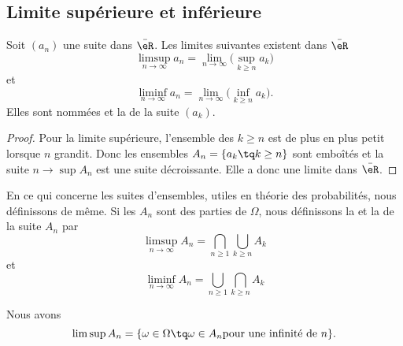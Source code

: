 \subsection{Limite supérieure et inférieure}

\begin{lemmaDef}      \label{ooMVZAooVVCOnP}
    Soit \( (a_n)\) une suite dans \( \bar \eR\). Les limites suivantes existent dans \( \bar \eR\)
    \begin{equation}
        \limsup_{n\to\infty}a_n=\lim_{n\to \infty}\big( \sup_{k\geq n}a_k \big)
    \end{equation}
    et
    \begin{equation}
        \liminf_{n\to \infty}a_n=\lim_{n\to\infty}\big( \inf_{k\geq n}a_k \big).
    \end{equation}
    Elles sont nommées  et la  de la suite \( (a_k)\).
\end{lemmaDef}

\begin{proof}
    Pour la limite supérieure, l'ensemble des \( k\geq n\) est de plus en plus petit lorsque \( n\) grandit. Donc les ensembles \( A_n=\{ a_k\tq k\geq n \}\) sont emboîtés et la suite \( n\to \sup A_n\) est une suite décroissante. Elle a donc une limite dans \( \bar \eR\).
\end{proof}

\begin{normaltext}      \label{ooEEQJooRMFzVR}
    En ce qui concerne les suites d'ensembles, utiles en théorie des probabilités, nous définissons de même. Si les \( A_n\) sont des parties de \( \Omega\), nous définissons la  et la  de la suite \( A_n\) par
\begin{equation}
    \limsup_{n\to\infty}A_n=\bigcap_{n\geq 1}\bigcup_{k\geq n}A_k
\end{equation}
et
\begin{equation}
    \liminf_{n\to\infty}A_n=\bigcup_{n\geq 1}\bigcap_{k\geq n}A_k
\end{equation}

Nous avons
\begin{equation}
    \limsup A_n=\{ \omega\in\Omega\tq \omega\in A_n\text{pour une infinité de } n \}.
\end{equation}
\end{normaltext}

